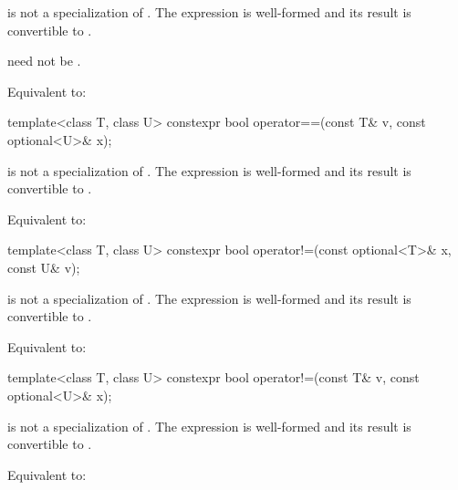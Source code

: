 \begin{itemdescr}
\pnum
\constraints
{} is not a specialization of .
The expression  is well-formed and
its result is convertible to .
\begin{note}
 need not be .
\end{note}

\pnum
\effects
Equivalent to: 
\end{itemdescr}

%
\begin{itemdecl}
template<class T, class U> constexpr bool operator==(const T& v, const optional<U>& x);
\end{itemdecl}

\begin{itemdescr}
\pnum
\constraints
{} is not a specialization of .
The expression  is well-formed and
its result is convertible to .

\pnum
\effects
Equivalent to: 
\end{itemdescr}

%
\begin{itemdecl}
template<class T, class U> constexpr bool operator!=(const optional<T>& x, const U& v);
\end{itemdecl}

\begin{itemdescr}
\pnum
\constraints
{} is not a specialization of .
The expression  is well-formed and
its result is convertible to .

\pnum
\effects
Equivalent to: 
\end{itemdescr}

%
\begin{itemdecl}
template<class T, class U> constexpr bool operator!=(const T& v, const optional<U>& x);
\end{itemdecl}

\begin{itemdescr}
\pnum
\constraints
{} is not a specialization of .
The expression  is well-formed and
its result is convertible to .

\pnum
\effects
Equivalent to: 
\end{itemdescr}

